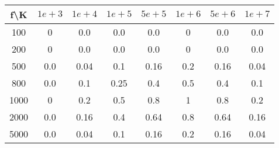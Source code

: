 \documentclass[12pt,a4paper]{article}
\begin{document}
\begin{tabular}{c | c c c c c c c}
f\textbackslash K & $1e+3$ & $1e+4$ & $1e+5$ & $5e+5$ & $1e+6$ & $5e+6$ & $1e+7$\\
\hline
100   & 0  & 0.0  & 0.0  & 0.0  & 0  & 0.0  & 0.0 \\
200   & 0  & 0.0  & 0.0  & 0.0  & 0  & 0.0  & 0.0 \\
500 & 0.0  & 0.04  & 0.1  & 0.16  & 0.2  & 0.16  & 0.04 \\
800 & 0.0  & 0.1  & 0.25  & 0.4  & 0.5  & 0.4  & 0.1 \\
1000   & 0  & 0.2  & 0.5  & 0.8  & 1  & 0.8  & 0.2 \\
2000 & 0.0  & 0.16  & 0.4  & 0.64  & 0.8  & 0.64  & 0.16 \\
5000 & 0.0  & 0.04  & 0.1  & 0.16  & 0.2  & 0.16  & 0.04 \\
\end{tabular}
\end{document}
